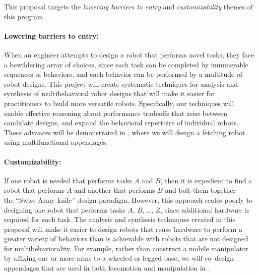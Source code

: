 \documentclass[11pt]{article}
\begin{document}
This proposal targets the 
\emph{lowering barriers to entry} 
and 
\emph{customizability} 
themes of this program. 


\paragraph{Lowering barriers to entry:} 
When an engineer attempts to design a robot that performs novel tasks, they face a bewildering array of choices, 
since
each task can be completed by innumerable sequences of behaviors,
and
each behavior can be performed by a multitude of robot designs.
This project will create systematic techniques for analysis and synthesis of multibehavioral robot designs that will make it easier for practitioners to build more versatile robots.
Specifically, 
our techniques will enable effective reasoning about performance tradeoffs that arise between candidate designs, 
and
expand the behavioral repertoire of individual robots.
These advances will be demonstrated in , where we will design a fetching robot using multifunctional appendages.



\paragraph{Customizability:}
If one robot is needed that performs tasks $A$ and $B$, then it is expedient to find a robot that performs $A$ and another that performs $B$ and bolt them together --- the ``Swiss Army knife'' design paradigm.
However, this approach scales poorly to designing one robot that performs tasks $A$, $B$, \dots, $Z$, since additional hardware is required for each task.
The analysis and synthesis techniques created in this proposal will make it easier to design robots that reuse hardware to perform a greater variety of behaviors than is achievable with robots that are not designed for multibehaviorality. 
For example, rather than construct a mobile manipulator by affixing one or more arms to a wheeled or legged base, we will co--design appendages that are used in both locomotion and manipulation in .
\end{document}
